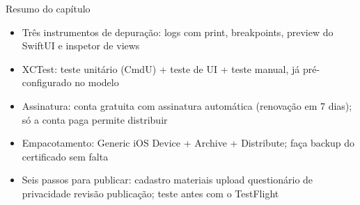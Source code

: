 \begin{tcbsummary}{Resumo do capítulo}
\begin{itemize}
  \item Três instrumentos de depuração: logs com print, breakpoints, preview do SwiftUI e inspetor de views
  \item XCTest: teste unitário (CmdU) + teste de UI + teste manual, já pré-configurado no modelo
  \item Assinatura: conta gratuita com assinatura automática (renovação em 7 dias); só a conta paga permite distribuir
  \item Empacotamento: Generic iOS Device + Archive + Distribute; faça backup do certificado sem falta
  \item Seis passos para publicar: cadastro materiais upload questionário de privacidade revisão publicação; teste antes com o TestFlight
\end{itemize}

\end{tcbsummary}

